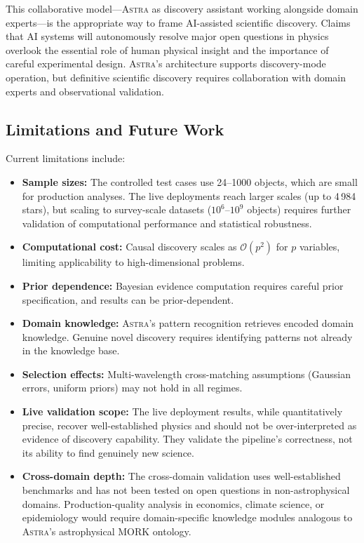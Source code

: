\documentclass[fleqn,usenatbib]{mnras}
\newcommand{\astra}{\textsc{Astra}\xspace}
\begin{document}
This collaborative model---\astra as discovery assistant working alongside domain experts---is the appropriate way to frame AI-assisted scientific discovery.
Claims that AI systems will autonomously resolve major open questions in physics overlook the essential role of human physical insight and the importance of careful experimental design.
\astra's architecture supports discovery-mode operation, but definitive scientific discovery requires collaboration with domain experts and observational validation.

\subsection{Limitations and Future Work}
\label{sec:discussion:limitations}

Current limitations include:
\begin{itemize}
  \item \textbf{Sample sizes:} The controlled test cases use 24--1000 objects, which are small for production analyses. The live deployments reach larger scales (up to 4\,984 stars), but scaling to survey-scale datasets ($10^{6}$--$10^{9}$ objects) requires further validation of computational performance and statistical robustness.
  \item \textbf{Computational cost:} Causal discovery scales as $\mathcal{O}(p^2)$ for $p$ variables, limiting applicability to high-dimensional problems.
  \item \textbf{Prior dependence:} Bayesian evidence computation requires careful prior specification, and results can be prior-dependent.
  \item \textbf{Domain knowledge:} \astra's pattern recognition retrieves encoded domain knowledge. Genuine novel discovery requires identifying patterns not already in the knowledge base.
  \item \textbf{Selection effects:} Multi-wavelength cross-matching assumptions (Gaussian errors, uniform priors) may not hold in all regimes.
  \item \textbf{Live validation scope:} The live deployment results, while quantitatively precise, recover well-established physics and should not be over-interpreted as evidence of discovery capability. They validate the pipeline's correctness, not its ability to find genuinely new science.
  \item \textbf{Cross-domain depth:} The cross-domain validation uses well-established benchmarks and has not been tested on open questions in non-astrophysical domains. Production-quality analysis in economics, climate science, or epidemiology would require domain-specific knowledge modules analogous to \astra's astrophysical MORK ontology.
\end{itemize}
\end{document}
